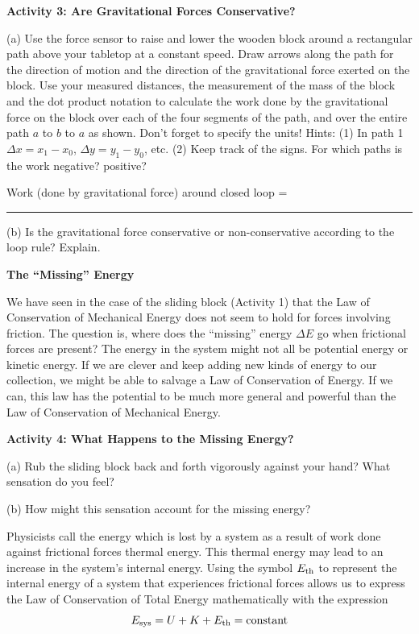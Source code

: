 \textbf{Activity 3: Are Gravitational Forces Conservative? }

(a) Use the force sensor to raise and lower the wooden block around a rectangular
path above your tabletop at a constant speed. Draw arrows along the path for the direction of motion and the direction of the gravitational force exerted on the block. Use your measured distances, the measurement of the mass of the block and the dot product notation to calculate the work done by the gravitational force on the block over each of the four segments of the path, and over the entire path $a$ to $b$ to $a$ as shown. Don't forget to specify the units! Hints: (1) In path 1 
\( \Delta  x = x_{1}  - x_{0} \), \( \Delta  y = y_{1}  - y_{0} \),
etc. (2) Keep track of the signs. For which paths is the work negative? positive?
\answerspace{40mm}

\hspace{1.5cm}Work (done by gravitational force) around closed loop = \rule{1.5in}{0.1pt}

\answerspace{5mm}

(b) Is the gravitational force conservative or non-conservative according to
the loop rule? Explain.
\answerspace{20mm}

\textbf{The ``Missing'' Energy} 

We have seen in the case of the sliding block (Activity 1) that the Law of Conservation of Mechanical Energy does not seem to hold for forces involving friction. The question is, where does the ``missing'' energy \( \Delta  \)$E$ go when
frictional forces are present? The energy in the system might not all be potential energy or kinetic energy. If we are clever and keep adding new kinds of energy to our collection, we might be able to salvage a Law of Conservation of Energy. If we can, this law has the potential to be much more general and powerful than the Law of Conservation of Mechanical Energy.

\pagebreak[2]
\textbf{Activity 4: What Happens to the Missing Energy?} 

(a) Rub the sliding block back and forth vigorously against your hand? What
sensation do you feel?
\vspace{10mm}

(b) How might this sensation account for the missing energy?
\vspace{20mm}

Physicists call the energy which is lost by a system as a result of work done
against frictional forces thermal energy. This thermal energy may lead to an
increase in the system's internal energy. Using the symbol \(  E_{\rm th} \) to
represent the internal energy of a system that experiences frictional
forces allows us to express the Law of Conservation of Total Energy 
mathematically with the expression
\[E_{\rm sys}=U+K+ E_{\rm th}=\mbox{constant}\]


